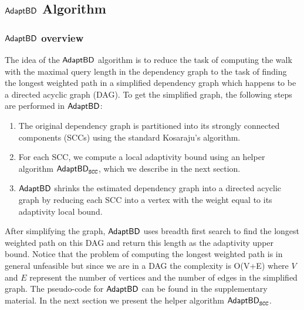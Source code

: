 \subsection{$\mathsf{AdaptBD}$ Algorithm}

\subsubsection{$\mathsf{AdaptBD}$ overview} 
The idea of the $\mathsf{AdaptBD}$ algorithm is to reduce the task of computing the
walk with the maximal query length in the dependency graph to the task of
finding the longest weighted path in a simplified dependency graph which happens to be a directed acyclic graph (DAG).
To get the simplified graph, the following steps are performed in $\mathsf{AdaptBD}$:
\begin{enumerate}
  \item The original dependency graph is partitioned into  
  its strongly connected components (SCCs) using the standard Kosaraju’s algorithm. 
  \item  For each SCC, we compute a local adaptivity bound using an helper algorithm $\mathsf{AdaptBD}_{\mathtt{SCC}}$, which we describe in the next section.
  \item  $\mathsf{AdaptBD}$ shrinks the estimated dependency graph into a directed acyclic graph
  by reducing each SCC into a vertex with the weight equal to its adaptivity local bound.
\end{enumerate}
After simplifying the graph, $\mathsf{AdaptBD}$ uses breadth first search  to find the longest
weighted path on this DAG and return this length as the adaptivity upper bound. Notice that the problem of computing the longest weighted path is in general unfeasible but since we are in a DAG the complexity is O(V+E) where $V$ and $E$ represent the number of vertices and the number of edges 
in the simplified graph. The pseudo-code for $\mathsf{AdaptBD}$ can be found in the supplementary material. In the next section we present the helper algorithm $\mathsf{AdaptBD}_{\mathtt{SCC}}$.


